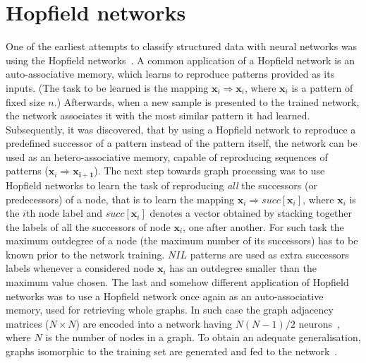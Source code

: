 \section{Hopfield networks}
One of the earliest attempts to classify structured data with neural networks was using the Hopfield networks~\cite{goulon2005hopfield}. A common application of a Hopfield network is an auto-associative memory, which learns to reproduce patterns provided as its inputs. (The task to be learned is the mapping $\bm{x}_i \Rightarrow \bm{x}_i$, where $\bm{x}_i$ is a pattern of fixed size $n$.) Afterwards, when a new sample is presented to the trained network, the network associates it with the most similar pattern it had learned. Subsequently, it was discovered, that by using a Hopfield network to reproduce a predefined successor of a pattern instead of the pattern itself, the network can be used as an hetero-associative memory, capable of reproducing sequences of patterns ($\bm{x}_i \Rightarrow \bm{x_{i+1}}$). The next step towards graph processing was to use Hopfield networks to learn the task of reproducing \emph{all} the successors (or predecessors) of a node, that is to learn the mapping $\bm{x}_i \Rightarrow succ[\bm{x}_i]$, where $\bm{x}_i$ is the $i$th node label and $succ[\bm{x}_i]$ denotes a vector obtained by stacking together the labels of all the successors of node $\bm{x}_i$, one after another. For such task the maximum outdegree of a node (the maximum number of its successors) has to be known prior to the network training. $NIL$ patterns are used as extra successors labels whenever a considered node $\bm{x}_i$ has an outdegree smaller than the maximum value chosen. The last and somehow different application of Hopfield networks was to use a Hopfield network once again as an auto-associative memory, used for retrieving whole graphs. In such case the graph adjacency matrices ($N \times N$) are encoded into a network having $N(N - 1)/2$ neurons~\cite{goulon2005hopfield}, where $N$ is the number of nodes in a graph. To obtain an adequate generalisation, graphs isomorphic to the training set are generated and fed to the network~\cite{kree1988recognition}.

